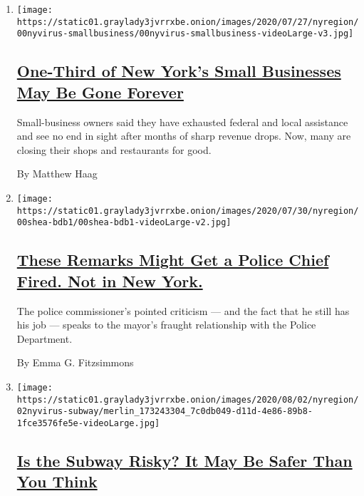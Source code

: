 \begin{enumerate}
\def\labelenumi{\arabic{enumi}.}
\item
  \texttt{[image: https://static01.graylady3jvrrxbe.onion/images/2020/07/27/nyregion/00nyvirus-smallbusiness/00nyvirus-smallbusiness-videoLarge-v3.jpg]}

  \hypertarget{one-third-of-new-yorks-small-businesses-may-be-gone-forever}{%
  \subsection{\texorpdfstring{\href{/2020/08/03/nyregion/nyc-small-businesses-closing-coronavirus.html}{One-Third
  of New York's Small Businesses May Be Gone
  Forever}}{One-Third of New York's Small Businesses May Be Gone Forever}}\label{one-third-of-new-yorks-small-businesses-may-be-gone-forever}}

  Small-business owners said they have exhausted federal and local
  assistance and see no end in sight after months of sharp revenue
  drops. Now, many are closing their shops and restaurants for good.

  By Matthew Haag
\item
  \texttt{[image: https://static01.graylady3jvrrxbe.onion/images/2020/07/30/nyregion/00shea-bdb1/00shea-bdb1-videoLarge-v2.jpg]}

  \hypertarget{these-remarks-might-get-a-police-chief-fired-not-in-new-york}{%
  \subsection{\texorpdfstring{\href{/2020/08/03/nyregion/police-shea-de-blasio-nyc.html}{These
  Remarks Might Get a Police Chief Fired. Not in New
  York.}}{These Remarks Might Get a Police Chief Fired. Not in New York.}}\label{these-remarks-might-get-a-police-chief-fired-not-in-new-york}}

  The police commissioner's pointed criticism --- and the fact that he
  still has his job --- speaks to the mayor's fraught relationship with
  the Police Department.

  By Emma G. Fitzsimmons
\item
  \texttt{[image: https://static01.graylady3jvrrxbe.onion/images/2020/08/02/nyregion/02nyvirus-subway/merlin\_173243304\_7c0db049-d11d-4e86-89b8-1fce3576fe5e-videoLarge.jpg]}

  \hypertarget{is-the-subway-risky-it-may-be-safer-than-you-think}{%
  \subsection{\texorpdfstring{\href{/2020/08/02/nyregion/nyc-subway-coronavirus-safety.html}{Is
  the Subway Risky? It May Be Safer Than You
  Think}}{Is the Subway Risky? It May Be Safer Than You Think}}\label{is-the-subway-risky-it-may-be-safer-than-you-think}}


\end{enumerate}
